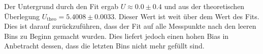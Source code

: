 Der Untergrund durch den Fit ergab $U \approx 0.0 \pm 0.4$ und aus der theoretischen Überlegung $U_\text{theo} = 5.4008 \pm 0.0033$.
Dieser Wert ist weit über dem Wert des Fits.
Dies ist darauf zurückzuführen, dass der Fit auf alle Messpunkte nach den leeren Bins zu Beginn gemacht wurden.
Dies liefert jedoch einen hohen Bias in Anbetracht dessen, dass die letzten Bins nicht mehr gefüllt sind.